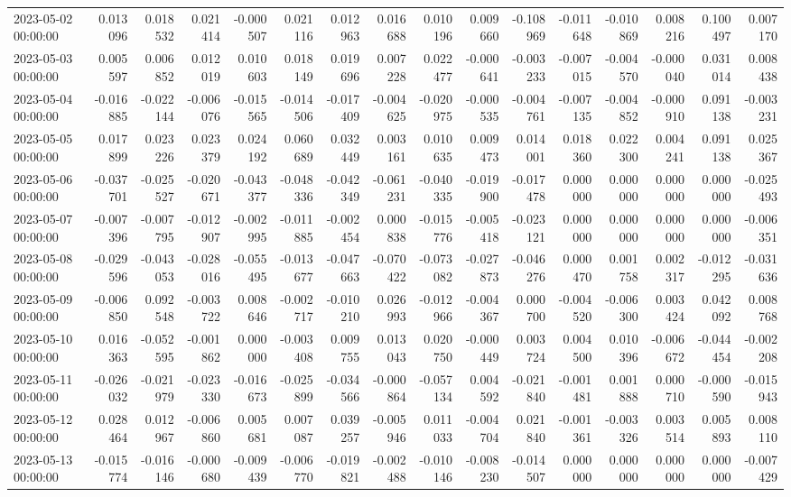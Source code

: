 \begin{tabular}{lrrrrrrrrrrrrrrr}
2023-05-02 00:00:00 & 0.013096 & 0.018532 & 0.021414 & -0.000507 & 0.021116 & 0.012963 & 0.016688 & 0.010196 & 0.009660 & -0.108969 & -0.011648 & -0.010869 & 0.008216 & 0.100497 & 0.007170 \\
2023-05-03 00:00:00 & 0.005597 & 0.006852 & 0.012019 & 0.010603 & 0.018149 & 0.019696 & 0.007228 & 0.022477 & -0.000641 & -0.003233 & -0.007015 & -0.004570 & -0.000040 & 0.031014 & 0.008438 \\
2023-05-04 00:00:00 & -0.016885 & -0.022144 & -0.006076 & -0.015565 & -0.014506 & -0.017409 & -0.004625 & -0.020975 & -0.000535 & -0.004761 & -0.007135 & -0.004852 & -0.000910 & 0.091138 & -0.003231 \\
2023-05-05 00:00:00 & 0.017899 & 0.023226 & 0.023379 & 0.024192 & 0.060689 & 0.032449 & 0.003161 & 0.010635 & 0.009473 & 0.014001 & 0.018360 & 0.022300 & 0.004241 & 0.091138 & 0.025367 \\
2023-05-06 00:00:00 & -0.037701 & -0.025527 & -0.020671 & -0.043377 & -0.048336 & -0.042349 & -0.061231 & -0.040335 & -0.019900 & -0.017478 & 0.000000 & 0.000000 & 0.000000 & 0.000000 & -0.025493 \\
2023-05-07 00:00:00 & -0.007396 & -0.007795 & -0.012907 & -0.002995 & -0.011885 & -0.002454 & 0.000838 & -0.015776 & -0.005418 & -0.023121 & 0.000000 & 0.000000 & 0.000000 & 0.000000 & -0.006351 \\
2023-05-08 00:00:00 & -0.029596 & -0.043053 & -0.028016 & -0.055495 & -0.013677 & -0.047663 & -0.070422 & -0.073082 & -0.027873 & -0.046276 & 0.000470 & 0.001758 & 0.002317 & -0.012295 & -0.031636 \\
2023-05-09 00:00:00 & -0.006850 & 0.092548 & -0.003722 & 0.008646 & -0.002717 & -0.010210 & 0.026993 & -0.012966 & -0.004367 & 0.000700 & -0.004520 & -0.006300 & 0.003424 & 0.042092 & 0.008768 \\
2023-05-10 00:00:00 & 0.016363 & -0.052595 & -0.001862 & 0.000000 & -0.003408 & 0.009755 & 0.013043 & 0.020750 & -0.000449 & 0.003724 & 0.004500 & 0.010396 & -0.006672 & -0.044454 & -0.002208 \\
2023-05-11 00:00:00 & -0.026032 & -0.021979 & -0.023330 & -0.016673 & -0.025899 & -0.034566 & -0.000864 & -0.057134 & 0.004592 & -0.021840 & -0.001481 & 0.001888 & 0.000710 & -0.000590 & -0.015943 \\
2023-05-12 00:00:00 & 0.028464 & 0.012967 & -0.006860 & 0.005681 & 0.007087 & 0.039257 & -0.005946 & 0.011033 & -0.004704 & 0.021840 & -0.001361 & -0.003326 & 0.003514 & 0.005893 & 0.008110 \\
2023-05-13 00:00:00 & -0.015774 & -0.016146 & -0.000680 & -0.009439 & -0.006770 & -0.019821 & -0.002488 & -0.010146 & -0.008230 & -0.014507 & 0.000000 & 0.000000 & 0.000000 & 0.000000 & -0.007429 \\

\end{tabular}
